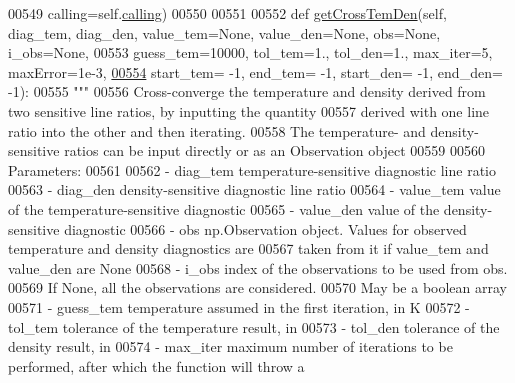 \begin{DoxyCode}
{00549                                       calling=self.\hyperlink{classpyneb_1_1core_1_1diags_1_1_diagnostics_a07dce673fec8b2383ef411ab94b0b2fe}{calling})
00550         
00551         
00552     \textcolor{keyword}{def }\hyperlink{classpyneb_1_1core_1_1diags_1_1_diagnostics_a2b0ebbaab7ce09624c1bc930e62bc228}{getCrossTemDen}(self, diag\_tem, diag\_den, value\_tem=None, value\_den=None, obs=None, 
      i\_obs=None,
00553                        guess\_tem=10000, tol\_tem=1., tol\_den=1., max\_iter=5, maxError=1e-3,
\hypertarget{diags_8py_source_l00554}{}\hyperlink{classpyneb_1_1core_1_1diags_1_1_diagnostics_a2b0ebbaab7ce09624c1bc930e62bc228}{00554}                        start\_tem= -1, end\_tem= -1, start\_den= -1, end\_den= -1):
00555         \textcolor{stringliteral}{"""}
00556 \textcolor{stringliteral}{        Cross-converge the temperature and density derived from two sensitive line ratios, by inputting the
       quantity }
00557 \textcolor{stringliteral}{        derived with one line ratio into the other and then iterating.}
00558 \textcolor{stringliteral}{        The temperature- and density-sensitive ratios can be input directly or as an Observation object}
00559 \textcolor{stringliteral}{    }
00560 \textcolor{stringliteral}{        Parameters:}
00561 \textcolor{stringliteral}{    }
00562 \textcolor{stringliteral}{        - diag\_tem   temperature-sensitive diagnostic line ratio}
00563 \textcolor{stringliteral}{        - diag\_den   density-sensitive diagnostic line ratio}
00564 \textcolor{stringliteral}{        - value\_tem  value of the temperature-sensitive diagnostic}
00565 \textcolor{stringliteral}{        - value\_den  value of the density-sensitive diagnostic}
00566 \textcolor{stringliteral}{        - obs        np.Observation object. Values for observed temperature and density diagnostics are}
00567 \textcolor{stringliteral}{                        taken from it if value\_tem and value\_den are None}
00568 \textcolor{stringliteral}{        - i\_obs      index of the observations to be used from obs. }
00569 \textcolor{stringliteral}{                        If None, all the observations are considered.}
00570 \textcolor{stringliteral}{                        May be a boolean array}
00571 \textcolor{stringliteral}{        - guess\_tem  temperature assumed in the first iteration, in K}
00572 \textcolor{stringliteral}{        - tol\_tem    tolerance of the temperature result, in %
00573 \textcolor{stringliteral}{        - tol\_den    tolerance of the density result, in %
00574 \textcolor{stringliteral}{        - max\_iter   maximum number of iterations to be performed, after which the function will throw a
}}}}
\end{DoxyCode}
